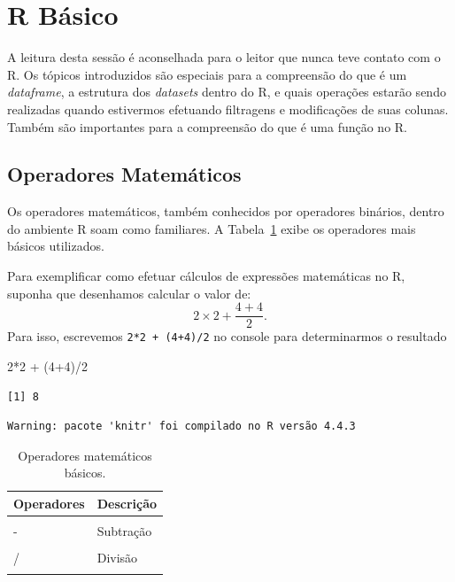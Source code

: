 \documentclass[
  12pt,
  letterpaper,
  DIV=11,
  numbers=noendperiod]{scrreprt}
\newenvironment{Shaded}{\begin{snugshade}}{\end{snugshade}}
\newcommand{\DecValTok}[1]{\textcolor[rgb]{0.68,0.00,0.00}{#1}}
\newcommand{\NormalTok}[1]{\textcolor[rgb]{0.00,0.23,0.31}{#1}}
\newcommand{\SpecialCharTok}[1]{\textcolor[rgb]{0.37,0.37,0.37}{#1}}
\theoremstyle{definition}
\theoremstyle{exemplo}
\begin{document}
\section{R Básico}\label{r-buxe1sico}

A leitura desta sessão é aconselhada para o leitor que nunca teve
contato com o R. Os tópicos introduzidos são especiais para a
compreensão do que é um \emph{dataframe}, a estrutura dos
\emph{datasets} dentro do R, e quais operações estarão sendo realizadas
quando estivermos efetuando filtragens e modificações de suas colunas.
Também são importantes para a compreensão do que é uma função no R.

\subsection{Operadores Matemáticos}\label{operadores-matemuxe1ticos}

Os operadores matemáticos, também conhecidos por operadores binários,
dentro do ambiente R soam como familiares. A Tabela~\ref{tbl-op-mat}
exibe os operadores mais básicos utilizados.

Para exemplificar como efetuar cálculos de expressões matemáticas no R,
suponha que desenhamos calcular o valor de:
\[2\times 2 + \frac{4 + 4}{2}.\] Para isso, escrevemos
\texttt{2*2\ +\ (4+4)/2} no console para determinarmos o resultado

\begin{Shaded}
\begin{Highlighting}[]
\DecValTok{2}\SpecialCharTok{*}\DecValTok{2} \SpecialCharTok{+}\NormalTok{ (}\DecValTok{4}\SpecialCharTok{+}\DecValTok{4}\NormalTok{)}\SpecialCharTok{/}\DecValTok{2}
\end{Highlighting}
\end{Shaded}

\begin{verbatim}
[1] 8
\end{verbatim}

\begin{verbatim}
Warning: pacote 'knitr' foi compilado no R versão 4.4.3
\end{verbatim}

\begin{longtable}[t]{ll}

\caption{\label{tbl-op-mat}Operadores matemáticos básicos.}

\tabularnewline

\toprule
Operadores & Descrição\\
\midrule
\cellcolor{gray!10}{+} & \cellcolor{gray!10}{Adição}\\
- & Subtração\\
\cellcolor{gray!10}{*} & \cellcolor{gray!10}{Multiplicação}\\
/ & Divisão\\
\cellcolor{gray!10}{\textasciicircum{}} & \cellcolor{gray!10}{Exponenciação}\\
\bottomrule

\end{longtable}
\end{document}
